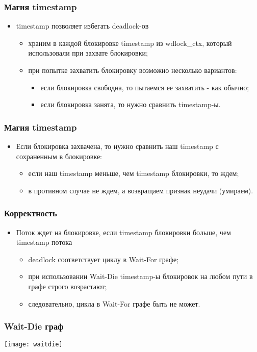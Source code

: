 \begin{frame}
\frametitle{Магия timestamp}
\begin{itemize}
    \item<1->timestamp позволяет избегать deadlock-ов
    \begin{itemize}
        \item<2->храним в каждой блокировке timestamp из wdlock\_ctx, который
             использовали при захвате блокировки;
        \item<3->при попытке захватить блокировку возможно несколько вариантов:
        \begin{itemize}
            \item<4->если блокировка свободна, то пытаемся ее захватить - как
                 обычно;
            \item<5->если блокировка занята, то нужно сравнить timestamp-ы.
        \end{itemize}
    \end{itemize}
\end{itemize}
\end{frame}

\begin{frame}
\frametitle{Магия timestamp}
\begin{itemize}
    \item<1->Если блокировка захвачена, то нужно сравнить наш timestamp с
         сохраненным в блокировке:
    \begin{itemize}
        \item<2->если наш timestamp меньше, чем timestamp блокировки, то ждем;
        \item<3->в противном случае не ждем, а возвращаем признак неудачи
             (умираем).
    \end{itemize}
\end{itemize}
\end{frame}

\begin{frame}
\frametitle{Корректность}
\begin{itemize}
    \item<1->Поток ждет на блокировке, если timestamp блокировки больше,
         чем timestamp потока
    \begin{itemize}
        \item<2->deadlock соответствует циклу в Wait-For графе;
        \item<3->при использовании Wait-Die timestamp-ы блокировок на любом
             пути в графе строго возрастают;
        \item<4->следовательно, цикла в Wait-For графе быть не может.
    \end{itemize}
\end{itemize}
\end{frame}

\begin{frame}
\frametitle{Wait-Die граф}
\texttt{[image: waitdie]}
\end{frame}

